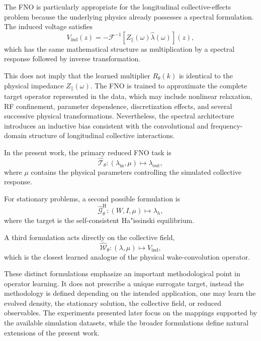 The FNO is particularly appropriate for the longitudinal collective-effects problem because the underlying physics already possesses a spectral formulation. The induced voltage satisfies
\begin{equation}
V_{\mathrm{ind}}(z)
=
-
\mathcal{F}^{-1}
\left[
Z_{\parallel}(\omega)
\widehat{\lambda}(\omega)
\right](z),
\label{eq:fno_induced_voltage_relation}
\end{equation}
which has the same mathematical structure as multiplication by a spectral response followed by inverse transformation.

This does not imply that the learned multiplier $R_{\theta}(k)$ is identical to the physical impedance $Z_{\parallel}(\omega)$. The FNO is trained to approximate the complete target operator represented in the data, which may include nonlinear relaxation, RF confinement, parameter dependence, discretization effects, and several successive physical transformations. Nevertheless, the spectral architecture introduces an inductive bias consistent with the convolutional and frequency-domain structure of longitudinal collective interactions.

In the present work, the primary reduced FNO task is
\begin{equation}
\widehat{\mathcal{T}}_{\theta}
:
(\lambda_{\mathrm{in}},\mu)
\longmapsto
\lambda_{\mathrm{out}},
\label{eq:fno_main_task}
\end{equation}
where $\mu$ contains the physical parameters controlling the simulated collective response.

For stationary problems, a second possible formulation is
\begin{equation}
\widehat{\mathcal{G}}_{\theta}^{\mathrm{H}}
:
(W,I,\mu)
\longmapsto
\lambda_h,
\label{eq:fno_haissinski_task}
\end{equation}
where the target is the self-consistent Ha"issinski equilibrium.

A third formulation acts directly on the collective field, 
\begin{equation}
\widehat{\mathcal{W}}_{\theta}
:
(\lambda,\mu)
\longmapsto
V_{\mathrm{ind}},
\label{eq:fno_voltage_task}
\end{equation}
which is the closest learned analogue of the physical wake-convolution operator.

These distinct formulations emphasize an important methodological point in operator learning. It does not prescribe a unique surrogate target, instead the methodology is defined depending on the intended application, one may learn the evolved density, the stationary solution, the collective field, or reduced observables. The experiments presented later focus on the mappings supported by the available simulation datasets, while the broader formulations define natural extensions of the present work.

